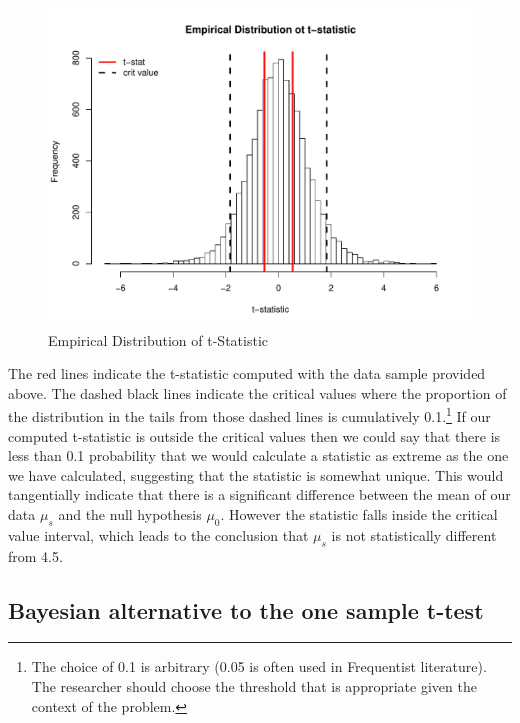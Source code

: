 \documentclass[12pt]{article}
\begin{document}
\begin{figure}[H]\caption[]{Empirical Distribution of t-Statistic}
\centering
\begin{minipage}{0.6\linewidth}
\includegraphics[trim={0cm 0cm 0cm 1.5cm}, clip, scale=0.6]{../figs/ttest_dist.pdf}
\end{minipage}
\end{figure}

\noindent The red lines indicate the t-statistic computed with the data sample provided above. The dashed black lines indicate the critical values where the proportion of the distribution in the tails from those dashed lines is cumulatively 0.1.\footnote{The choice of 0.1 is arbitrary (0.05 is often used in Frequentist literature). The researcher should choose the threshold that is appropriate given the context of the problem.} If our computed t-statistic is outside the critical values then we could say that there is less than 0.1 probability that we would calculate a statistic as extreme as the one we have calculated, suggesting that the statistic is somewhat unique. This would tangentially indicate that there is a significant difference between the mean of our data $\mu_s$ and the null hypothesis $\mu_0$. However the statistic falls inside the critical value interval, which leads to the conclusion that $\mu_s$ is not statistically different from 4.5. \\

\subsection{Bayesian alternative to the one sample t-test}
\end{document}
